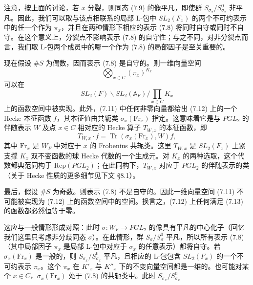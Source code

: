 \documentclass[11pt,a4paper]{article}
\newcommand{\Tr}{\operatorname{Tr}}
\begin{document}
注意，按上面的讨论，若 $x$ 分裂，则同态 (7.9) 的像平凡，即使群 $S_{\sigma_x}/S_{\sigma_x}^0$ 非平凡。因此，我们可以取与该点相联系的局部 L-包中 $SL_2(F_x)$ 的两个不可约表示中的任一个作为 $\pi_x$，并且在两种情形下相应的表示 (7.8) 将同时自守或同时不自守。在这个意义上，分裂点不影响表示 (7.8) 的自守性；与之不同，对非分裂点而言，我们取 L-包两个成员中的哪一个作为 (7.8) 的局部因子是至关重要的。

现在假设 $\#S$ 为偶数，因而表示 (7.8) 是自守的。则一维向量空间
\begin{equation}\tag{7.11}
\bigotimes_{x\in C}(\pi_x)^{K_x}
\end{equation}
可以在
\begin{equation}\tag{7.12}
SL_2(F)\backslash SL_2(\mathbb{A}_F)\Big/\prod_{x\in C}K_x
\end{equation}
上的函数空间中被实现。此外，(7.11) 中任何非零向量都给出 (7.12) 上的一个 Hecke 本征函数 $f$，其本征值由共轭类 $\sigma_x(\mathrm{Fr}_x)$ 指定。这意味着它是与 $PGL_2$ 的伴随表示 $W$ 及点 $x\in C$ 相对应的 Hecke 算子 $T_{W,x}$ 的本征函数，即
\begin{equation}\tag{7.13}
T_{W,x}\cdot f = \Tr(\sigma_x(\mathrm{Fr}_x),W)f,
\end{equation}
其中 $\mathrm{Fr}_x$ 是 $W_F$ 中对应于 $x$ 的 Frobenius 共轭类。这里 $T_{W,x}$ 是 $SL_2(F_x)$ 上紧支撑 $K_x$ 双不变函数的球 Hecke 代数的一个生成元。对 $K_x$ 的两种选取，这个代数都典范同构于 $\mathrm{Rep}(PGL_2)$；在此同构下，$T_{W,x}$ 对应于 $PGL_2$ 的伴随表示的类（关于 Hecke 性质的更多细节见下文 §8.1）。

最后，假设 $\#S$ 为奇数。则表示 (7.8) 不是自守的。因此一维向量空间 (7.11) 不可能被实现为 (7.12) 上的函数空间中的空间。换言之，(7.12) 上任何满足 (7.13) 的函数都必然恒等于零。

这应与一般情形形成对照：此时 $\sigma: W_F\to PGL_2$ 的像具有平凡的中心化子（回忆我们这里只考虑非分歧同态 $\sigma$）。在此情形，群 $S_\sigma/S_\sigma^0$ 平凡，所以所有表示 (7.8)（其中局部因子 $\pi_x$ 是局部 L-包中对应于 $\sigma_x$ 的任意表示）都将自守。若 $\sigma_x(\mathrm{Fr}_x)$ 是一般的，则 $S_{\sigma_x}/S_{\sigma_x}^0$ 平凡，且相应的 L-包包含 $SL_2(F_x)$ 的一个不可约表示 $\pi_x$。这个 $\pi_x$ 在 $K'_x$ 与 $K''_x$ 下的不变向量空间都是一维的。也可能对某个 $x\in C$，$\sigma_x(\mathrm{Fr}_x)$ 处于 (7.8) 的共轭类中。此时 $S_{\sigma_x}/S_{\sigma_x}^0$
\end{document}
